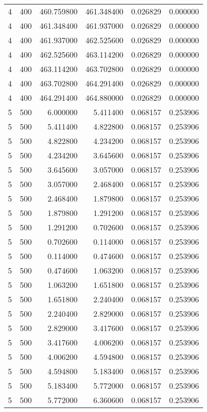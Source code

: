 \begin{longtable}{rrrrrr}
4 & 400 & 460.759800 & 461.348400 & 0.026829 & 0.000000 \\
4 & 400 & 461.348400 & 461.937000 & 0.026829 & 0.000000 \\
4 & 400 & 461.937000 & 462.525600 & 0.026829 & 0.000000 \\
4 & 400 & 462.525600 & 463.114200 & 0.026829 & 0.000000 \\
4 & 400 & 463.114200 & 463.702800 & 0.026829 & 0.000000 \\
4 & 400 & 463.702800 & 464.291400 & 0.026829 & 0.000000 \\
4 & 400 & 464.291400 & 464.880000 & 0.026829 & 0.000000 \\
5 & 500 & 6.000000 & 5.411400 & 0.068157 & 0.253906 \\
5 & 500 & 5.411400 & 4.822800 & 0.068157 & 0.253906 \\
5 & 500 & 4.822800 & 4.234200 & 0.068157 & 0.253906 \\
5 & 500 & 4.234200 & 3.645600 & 0.068157 & 0.253906 \\
5 & 500 & 3.645600 & 3.057000 & 0.068157 & 0.253906 \\
5 & 500 & 3.057000 & 2.468400 & 0.068157 & 0.253906 \\
5 & 500 & 2.468400 & 1.879800 & 0.068157 & 0.253906 \\
5 & 500 & 1.879800 & 1.291200 & 0.068157 & 0.253906 \\
5 & 500 & 1.291200 & 0.702600 & 0.068157 & 0.253906 \\
5 & 500 & 0.702600 & 0.114000 & 0.068157 & 0.253906 \\
5 & 500 & 0.114000 & 0.474600 & 0.068157 & 0.253906 \\
5 & 500 & 0.474600 & 1.063200 & 0.068157 & 0.253906 \\
5 & 500 & 1.063200 & 1.651800 & 0.068157 & 0.253906 \\
5 & 500 & 1.651800 & 2.240400 & 0.068157 & 0.253906 \\
5 & 500 & 2.240400 & 2.829000 & 0.068157 & 0.253906 \\
5 & 500 & 2.829000 & 3.417600 & 0.068157 & 0.253906 \\
5 & 500 & 3.417600 & 4.006200 & 0.068157 & 0.253906 \\
5 & 500 & 4.006200 & 4.594800 & 0.068157 & 0.253906 \\
5 & 500 & 4.594800 & 5.183400 & 0.068157 & 0.253906 \\
5 & 500 & 5.183400 & 5.772000 & 0.068157 & 0.253906 \\
5 & 500 & 5.772000 & 6.360600 & 0.068157 & 0.253906 \\

\end{longtable}
